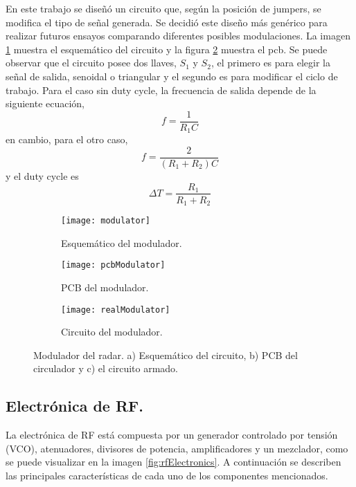En este trabajo se diseñó un circuito que, según la posición de jumpers, se modifica el tipo de señal generada. Se decidió este diseño más genérico para realizar futuros ensayos comparando diferentes posibles modulaciones. La imagen \ref{fig:schematicModulator} muestra el esquemático del circuito y la figura \ref{fig:pcbModulator} muestra el pcb. Se puede observar que el circuito posee dos llaves, $S_1$ y $S_2$, el primero es para elegir la señal de salida, senoidal o triangular y el segundo es para modificar el ciclo de trabajo. Para el caso sin duty cycle, la frecuencia de salida depende de la siguiente ecuación,
\begin{equation}
  f = \dfrac{1}{R_1C}
\end{equation}
en cambio, para el otro caso, 
\begin{equation}
  f = \dfrac{2}{(R_1 + R_2)C}
\end{equation}
y el duty cycle es
\begin{equation}
  \Delta T = \dfrac{R_1}{R_1 + R_2}
\end{equation}
\begin{figure}[htb]
  \centering
  \begin{subfigure}[b]{0.55\textwidth}
    \texttt{[image: modulator]}
    \caption{Esquemático del modulador.}
    \label{fig:schematicModulator} 
  \end{subfigure}

  \begin{subfigure}[b]{0.4\textwidth}
    \texttt{[image: pcbModulator]}
    \caption{PCB del modulador.}
    \label{fig:pcbModulator}
  \end{subfigure}
  \begin{subfigure}[b]{0.4\textwidth}
    \texttt{[image: realModulator]}
    \caption{Circuito del modulador.}
  \end{subfigure}
  \caption{Modulador del radar.  a) Esquemático del circuito, b) PCB del circulador y c) el circuito armado.}
\end{figure}

\subsection{Electrónica de RF.}

La electrónica de RF está compuesta por un generador controlado por tensión (VCO), atenuadores, divisores de potencia, amplificadores y un mezclador, como se puede visualizar en la imagen \ref{fig:rfElectronics}. A continuación se describen las principales características de cada uno de los componentes mencionados.

